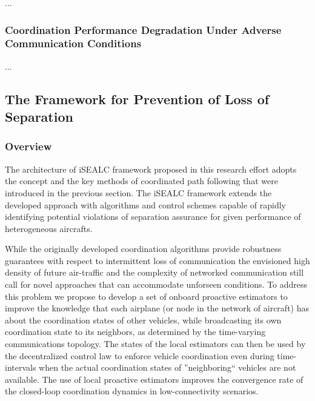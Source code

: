 \documentclass[letter,onecolumn,12pt]{aiaa-tc}
\newcommand{\1}{1_n}
\begin{document}
...

\subsubsection{Coordination Performance Degradation Under Adverse Communication Conditions}

...


\subsection{The Framework for Prevention of Loss of Separation }
\label{subsec:framework}

\subsubsection{Overview}
The architecture of iSEALC framework proposed in this research effort adopts the concept and the key methods of coordinated path following that were introduced in the previous section. The iSEALC framework extends the developed  approach with algorithms and control schemes capable of rapidly identifying potential violations of separation assurance for given performance of heterogeneous aircrafts. 

While the originally developed coordination algorithms provide robustness guarantees with respect to intermittent loss of communication the envisioned high density of future air-traffic and the complexity of networked communication still call for novel approaches that can accommodate unforseen conditions. To address this problem we propose to develop a set of onboard proactive estimators to improve the knowledge that each airplane (or node in the network of aircraft) has about the coordination states of other vehicles, while  broadcasting its own coordination state to its neighbors, as determined by the time-varying communications topology. The states of the local estimators can then be used by the decentralized control law to enforce vehicle coordination even during time-intervals when the actual coordination states of ''neighboring`` vehicles are not available. The use of local proactive estimators improves the convergence rate of the closed-loop coordination dynamics in low-connectivity scenarios.
\end{document}
